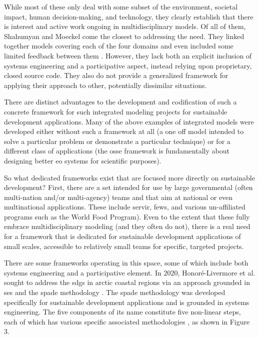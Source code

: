 While most of these only deal with some subset of the environment, societal impact, human decision-making, and technology, they clearly establish that there is interest and active work ongoing in multidisciplinary models. Of all of them, Shahumyan and Moeckel come the closest to addressing the need. They linked together models covering each of the four domains and even included some limited feedback between them \cite{shahumyanIntegrationLandUse2017}. However, they lack both an explicit inclusion of systems engineering and a participative aspect, instead relying upon proprietary, closed source code. They also do not provide a generalized framework for applying their approach to other, potentially dissimilar situations.

There are distinct advantages to the development and codification of such a concrete framework for such integrated modeling projects for sustainable development applications. Many of the above examples of integrated models were developed either without such a framework at all (a one off model intended to solve a particular problem or demonstrate a particular technique) or for a different class of applications (the \ac{osse} framework is fundamentally about designing better \ac{eo} systems for scientific purposes). 

So what dedicated frameworks exist that are focused more directly on sustainable development? First, there are a set intended for use by large governmental (often multi-nation and/or multi-agency) teams and that aim at national or even multinational applications. These include \ac{servir}, \ac{fews}, and various \ac{un}-affiliated programs such as the World Food Program). Even to the extent that these fully embrace multidisciplinary modeling (and they often do not), there is a real need for a framework that is dedicated for sustainable development applications of small scales, accessible to relatively small teams for specific, targeted projects.

There are some frameworks operating in this space, some of which include both systems engineering and a participative element. In 2020, Honoré-Livermore et al. sought to address the \acp{sdg} in arctic coastal regions via an approach grounded in \ac{ses} and the \ac{spade} methodology \cite{honore-livermoreAddressingSustainableDevelopment2020}. The \ac{spade} methodology was developed specifically for sustainable development applications and is grounded in systems engineering. The five components of its name constitute five non-linear steps, each of which has various specific associated methodologies \cite{haskinsSystemsEngineeringAnalyzed2008}, as shown in Figure 3.


